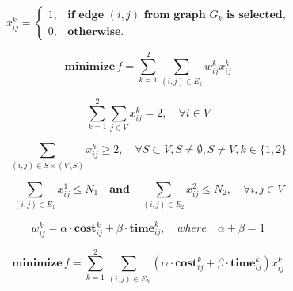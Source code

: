 \documentclass{article}
\begin{document}
\boldmath%

\begin{equation*}
    x_{ij}^k =
    \begin{cases}
      1, & \textbf{if edge } (i, j) \textbf{ from graph } G_k \textbf{ is selected,} \\
      0, & \textbf{otherwise.}
    \end{cases}
\end{equation*}


\begin{equation*}
    \textbf{minimize} \, f = \sum_{k=1}^{2} \sum_{(i,j) \in E_k} w_{ij}^k x_{ij}^k
  \end{equation*}


\begin{equation*}
    \sum_{k=1}^{2} \sum_{j \in V} x_{ij}^k = 2, \quad \forall i \in V
\end{equation*}

\begin{equation}
    \sum_{(i,j) \in S \times (V \setminus S)} x_{ij}^k \geq 2, \quad \forall S \subset V, S \neq \emptyset, S \neq V, k \in \{1, 2\}\label{eq:Nosubtour}
\end{equation}

\begin{equation*}
    \sum_{(i,j) \in E_1} x_{ij}^1 \leq N_1 \quad \textbf{and} \quad \sum_{(i,j) \in E_2} x_{ij}^2 \leq N_2,  \quad \forall i,j \in V
\end{equation*}

\begin{equation*}
    w_{ij}^k = \alpha \cdot \textbf{cost}_{ij}^k + \beta \cdot \textbf{time}_{ij}^k, \quad where \quad \alpha + \beta = 1
\end{equation*}


\begin{equation*}
    \textbf{minimize}\, f = \sum_{k=1}^{2} \sum_{(i,j) \in E_k} (\alpha \cdot \textbf{cost}_{ij}^k + \beta \cdot \textbf{time}_{ij}^k) x_{ij}^k
\end{equation*}
\end{document}
